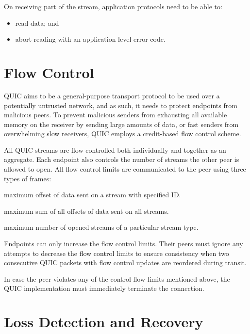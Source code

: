 On receiving part of the stream, application protocols need to be able to:

\begin{itemize}

  \item read data; and

  \item abort reading with an application-level error code.

\end{itemize}

\section{Flow Control}

QUIC aims to be a general-purpose transport protocol to be used over a potentially untrusted
network, and as such, it needs to protect endpoints from malicious peers. To prevent malicious
senders from exhausting all available memory on the receiver by sending large amounts of data, or
fast senders from overwhelming slow receivers, QUIC employs a credit-based flow control scheme.

All QUIC streams are flow controlled both individually and together as an aggregate. Each endpoint
also controls the number of streams the other peer is allowed to open. All flow control limits are
communicated to the peer using three types of frames:

\begin{itemize}

\litem{\MAXSTREAMDATA{}} maximum offset of data sent on a stream with specified ID\@.

\litem{\MAXDATA{}} maximum sum of all offsets of data sent on all streams.

\litem{\MAXSTREAMS{}} maximum number of opened streams of a particular stream type.

\end{itemize}

Endpoints can only increase the flow control limits. Their peers must ignore any attempts to
decrease the flow control limits to ensure consistency when two consecutive QUIC packets with flow
control updates are reordered during transit.

In case the peer violates any of the control flow limits mentioned above, the QUIC implementation
must immediately terminate the connection.

\section{Loss Detection and Recovery}

